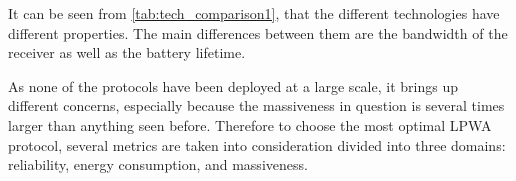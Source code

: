 
It can be seen from \autoref{tab:tech_comparison1}, that the different technologies have different properties. The main differences between them are the bandwidth of the receiver as well as the battery lifetime. 

As none of the protocols have been deployed at a large scale, it brings up different concerns, especially because the massiveness in question is several times larger than anything seen before. Therefore to choose the most optimal LPWA protocol, several metrics are taken into consideration divided into three domains: reliability, energy consumption, and massiveness. 

